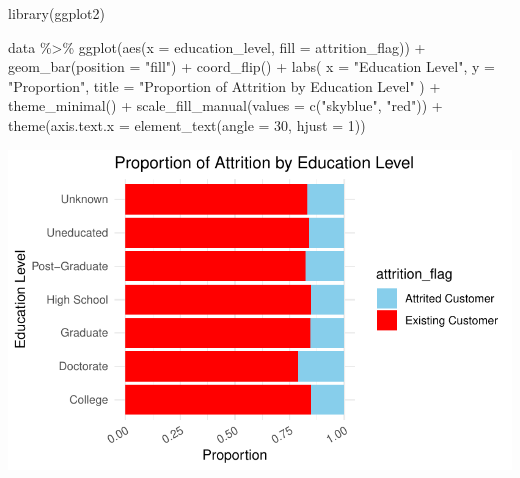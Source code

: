 \documentclass[
  letterpaper,
  DIV=11,
  numbers=noendperiod]{scrartcl}
\newenvironment{Shaded}{\begin{snugshade}}{\end{snugshade}}
\newcommand{\AttributeTok}[1]{\textcolor[rgb]{0.40,0.45,0.13}{#1}}
\newcommand{\DecValTok}[1]{\textcolor[rgb]{0.68,0.00,0.00}{#1}}
\newcommand{\FunctionTok}[1]{\textcolor[rgb]{0.28,0.35,0.67}{#1}}
\newcommand{\NormalTok}[1]{\textcolor[rgb]{0.00,0.23,0.31}{#1}}
\newcommand{\SpecialCharTok}[1]{\textcolor[rgb]{0.37,0.37,0.37}{#1}}
\newcommand{\StringTok}[1]{\textcolor[rgb]{0.13,0.47,0.30}{#1}}
\begin{document}
\begin{Shaded}
\begin{Highlighting}[]
\FunctionTok{library}\NormalTok{(ggplot2)}

\NormalTok{data }\SpecialCharTok{\%\textgreater{}\%}
  \FunctionTok{ggplot}\NormalTok{(}\FunctionTok{aes}\NormalTok{(}\AttributeTok{x =}\NormalTok{ education\_level, }\AttributeTok{fill =}\NormalTok{ attrition\_flag)) }\SpecialCharTok{+}
  \FunctionTok{geom\_bar}\NormalTok{(}\AttributeTok{position =} \StringTok{"fill"}\NormalTok{) }\SpecialCharTok{+}
  \FunctionTok{coord\_flip}\NormalTok{() }\SpecialCharTok{+}
  \FunctionTok{labs}\NormalTok{(}
    \AttributeTok{x =} \StringTok{"Education Level"}\NormalTok{,}
    \AttributeTok{y =} \StringTok{"Proportion"}\NormalTok{,}
    \AttributeTok{title =} \StringTok{"Proportion of Attrition by Education Level"}
\NormalTok{  ) }\SpecialCharTok{+}
  \FunctionTok{theme\_minimal}\NormalTok{() }\SpecialCharTok{+}
  \FunctionTok{scale\_fill\_manual}\NormalTok{(}\AttributeTok{values =} \FunctionTok{c}\NormalTok{(}\StringTok{"skyblue"}\NormalTok{, }\StringTok{"red"}\NormalTok{)) }\SpecialCharTok{+}
  \FunctionTok{theme}\NormalTok{(}\AttributeTok{axis.text.x =} \FunctionTok{element\_text}\NormalTok{(}\AttributeTok{angle =} \DecValTok{30}\NormalTok{, }\AttributeTok{hjust =} \DecValTok{1}\NormalTok{))}
\end{Highlighting}
\end{Shaded}

\includegraphics{Tackling-Attrition-at-Tifosi-Bank_files/figure-pdf/unnamed-chunk-12-1.pdf}
\end{document}
